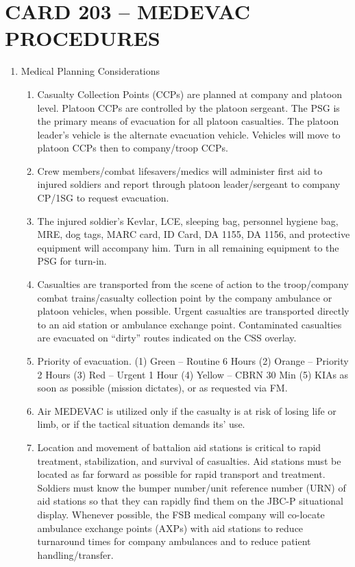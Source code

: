 \documentclass{article}
\begin{document}
\newpage
\section*{CARD 203 – MEDEVAC PROCEDURES}
\begin{enumerate}
    \item 	Medical Planning Considerations
    \begin{enumerate}
        \item Casualty Collection Points (CCPs) are planned at company and platoon level.  Platoon CCPs are controlled by the platoon sergeant.  The PSG is the primary means of evacuation for all platoon casualties.  The platoon leader’s vehicle is the alternate evacuation vehicle.  Vehicles will move to platoon CCPs then to company/troop CCPs.
\item	Crew members/combat lifesavers/medics will administer first aid to injured soldiers and report through platoon leader/sergeant to company CP/1SG to request evacuation.
\item	The injured soldier’s Kevlar, LCE, sleeping bag, personnel hygiene bag, MRE, dog tags, MARC card, ID Card, DA 1155, DA 1156, and protective equipment will accompany him.  Turn in all remaining equipment to the PSG for turn-in.
\item	Casualties are transported from the scene of action to the troop/company combat trains/casualty collection point by the company ambulance or platoon 	vehicles, when possible.  Urgent casualties are transported directly to an aid station or ambulance exchange point.  Contaminated casualties are evacuated on “dirty” routes indicated on the CSS overlay.
\item	Priority of evacuation.
		(1)	Green – Routine		6 Hours
		(2)	Orange – Priority		2 Hours
		(3)	Red – Urgent			1 Hour
		(4)	Yellow – CBRN		30 Min
		(5)	KIAs as soon as possible (mission dictates), or as requested via FM.
\item	Air MEDEVAC is utilized only if the casualty is at risk of losing life or limb, or if the tactical situation demands its’ use.
\item	Location and movement of battalion aid stations is critical to rapid treatment, stabilization, and survival of casualties.  Aid stations must be located as far forward as possible for rapid transport and treatment.  Soldiers must know the bumper number/unit reference number (URN) of aid stations so that they can rapidly find them on the JBC-P situational display.  Whenever 	possible, the FSB medical company will co-locate ambulance exchange points (AXPs) with aid stations to reduce turnaround times for company ambulances and to reduce patient handling/transfer.

\end{enumerate}
\end{enumerate}
\end{document}
